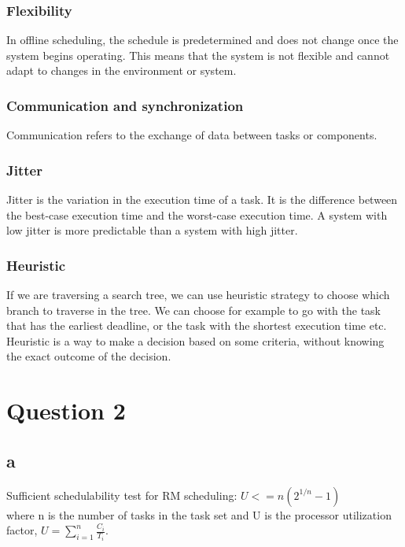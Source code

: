             \subsubsection{Flexibility}
            In offline scheduling, the schedule is predetermined and does not change once the system begins operating. This means that the system is not flexible and cannot adapt to changes in the environment or system.

            \subsubsection{Communication and synchronization}
            Communication refers to the exchange of data between tasks or components. 

            \subsubsection{Jitter}
            Jitter is the variation in the execution time of a task. It is the difference between the best-case execution time and the worst-case execution time. A system with low jitter is more predictable than a system with high jitter.

            \subsubsection{Heuristic}
            If we are traversing a search tree, we can use heuristic strategy to choose which branch to traverse in the tree. We can choose for example to go with the task that has the earliest deadline, or the task with the shortest execution time etc. Heuristic is a way to make a decision based on some criteria, without knowing the exact outcome of the decision. 


    \section{Question 2}
        \subsection{a}
            Sufficient schedulability test for RM scheduling: $U <= n(2^{1/n} - 1)$ \\ where n is the number of tasks in the task set and U is the processor utilization factor, $U = \sum_{i=1}^{n} \frac{C_i}{T_i}$. 

